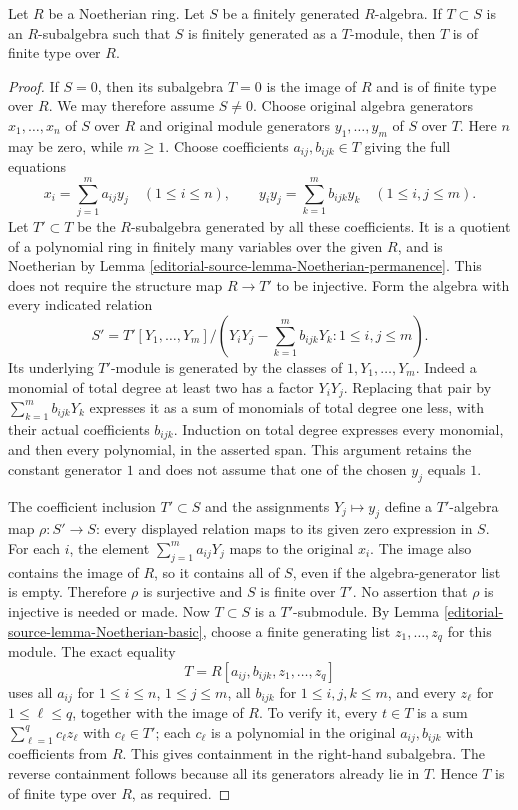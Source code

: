 \begin{lemma}
\label{editorial-source-lemma-Artin-Tate}
Let $R$ be a Noetherian ring. Let $S$ be a finitely
generated $R$-algebra. If $T \subset S$ is an $R$-subalgebra such
that $S$ is finitely generated as a $T$-module, then $T$ is of
finite type over $R$.
\end{lemma}

\begin{proof}
If $S=0$, then its subalgebra $T=0$ is the image of $R$ and
is of finite type over $R$. We may therefore assume $S\neq0$.
Choose original algebra generators $x_1,\ldots,x_n$ of $S$
over $R$ and original module generators $y_1,\ldots,y_m$ of
$S$ over $T$. Here $n$ may be zero, while $m\geq1$.
Choose coefficients $a_{ij},b_{ijk}\in T$ giving the full equations
$$
x_i=\sum_{j=1}^m a_{ij}y_j\quad(1\leq i\leq n),\qquad
y_i y_j=\sum_{k=1}^m b_{ijk}y_k\quad(1\leq i,j\leq m).
$$
Let $T'\subset T$ be the $R$-subalgebra generated by all these
coefficients. It is a quotient of a polynomial ring in finitely
many variables over the given $R$, and is Noetherian by
Lemma \ref{editorial-source-lemma-Noetherian-permanence}. This does not require
the structure map $R\to T'$ to be injective.
Form the algebra with every indicated relation
$$
S'=T'[Y_1,\ldots,Y_m]\big/
\left(Y_iY_j-\sum_{k=1}^m b_{ijk}Y_k:
1\leq i,j\leq m\right).
$$
Its underlying $T'$-module is generated by the classes of
$1,Y_1,\ldots,Y_m$. Indeed a monomial of total degree at least
two has a factor $Y_iY_j$. Replacing that pair by
$\sum_{k=1}^m b_{ijk}Y_k$ expresses it as a sum of monomials
of total degree one less, with their actual coefficients
$b_{ijk}$. Induction on total degree expresses every monomial,
and then every polynomial, in the asserted span. This argument
retains the constant generator $1$ and does not assume that one
of the chosen $y_j$ equals $1$.

The coefficient inclusion $T'\subset S$ and the assignments
$Y_j\mapsto y_j$ define a $T'$-algebra map $\rho:S'\to S$:
every displayed relation maps to its given zero expression in $S$.
For each $i$, the element $\sum_{j=1}^m a_{ij}Y_j$ maps to
the original $x_i$. The image also contains the image of $R$,
so it contains all of $S$, even if the algebra-generator list is
empty. Therefore $\rho$ is surjective and $S$ is finite over
$T'$. No assertion that $\rho$ is injective is needed or made.
Now $T\subset S$ is a $T'$-submodule. By
Lemma \ref{editorial-source-lemma-Noetherian-basic}, choose a finite generating
list $z_1,\ldots,z_q$ for this module. The exact equality
$$
T=R[a_{ij},b_{ijk},z_1,\ldots,z_q]
$$
uses all $a_{ij}$ for $1\leq i\leq n$, $1\leq j\leq m$,
all $b_{ijk}$ for $1\leq i,j,k\leq m$, and every $z_\ell$
for $1\leq\ell\leq q$, together with the image of $R$.
To verify it, every $t\in T$ is a sum
$\sum_{\ell=1}^q c_\ell z_\ell$ with $c_\ell\in T'$;
each $c_\ell$ is a polynomial in the original $a_{ij},b_{ijk}$
with coefficients from $R$. This gives containment in the
right-hand subalgebra. The reverse containment follows because
all its generators already lie in $T$. Hence $T$ is of finite
type over $R$, as required.
\end{proof}